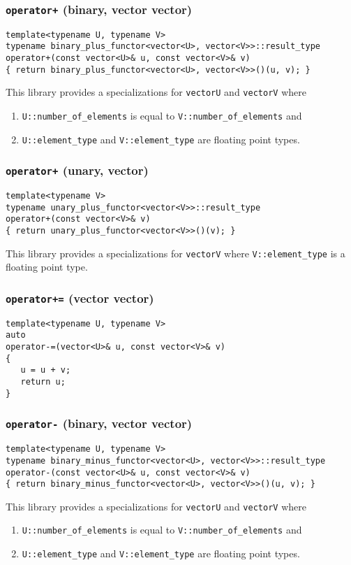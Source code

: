 \documentclass[oneside]{book}
\begin{document}
\subsubsection{\texttt{operator+} (binary, vector vector)}
\begin{verbatim}
template<typename U, typename V>
typename binary_plus_functor<vector<U>, vector<V>>::result_type
operator+(const vector<U>& u, const vector<V>& v)
{ return binary_plus_functor<vector<U>, vector<V>>()(u, v); }
\end{verbatim}
This library provides a specializations for \texttt{vector\textlangle U\textrangle}
and \texttt{vector\textlangle V\textrangle} where
\begin{enumerate}
	\item \texttt{U::number\_of\_elements} is equal to \texttt{V::number\_of\_elements} and
	\item \texttt{U::element\_type} and \texttt{V::element\_type} are floating point types.
\end{enumerate}

\subsubsection{\texttt{operator+} (unary, vector)}
\begin{verbatim}
template<typename V>
typename unary_plus_functor<vector<V>>::result_type
operator+(const vector<V>& v)
{ return unary_plus_functor<vector<V>>()(v); }
\end{verbatim}
This library provides a specializations for \texttt{vector\textlangle V\textrangle}
where \texttt{V::element\_type} is a floating point type.

\subsubsection{\texttt{operator+=} (vector vector)}
\begin{verbatim}
template<typename U, typename V>
auto
operator-=(vector<U>& u, const vector<V>& v)
{
   u = u + v;
   return u;
}
\end{verbatim}
\subsubsection{\texttt{operator-} (binary, vector vector)}
\begin{verbatim}
template<typename U, typename V>
typename binary_minus_functor<vector<U>, vector<V>>::result_type
operator-(const vector<U>& u, const vector<V>& v)
{ return binary_minus_functor<vector<U>, vector<V>>()(u, v); }
\end{verbatim}
This library provides a specializations for \texttt{vector\textlangle U\textrangle}
and \texttt{vector\textlangle V\textrangle} where
\begin{enumerate}
	\item \texttt{U::number\_of\_elements} is equal to \texttt{V::number\_of\_elements} and
	\item \texttt{U::element\_type} and \texttt{V::element\_type} are floating point types.
\end{enumerate}
\end{document}
